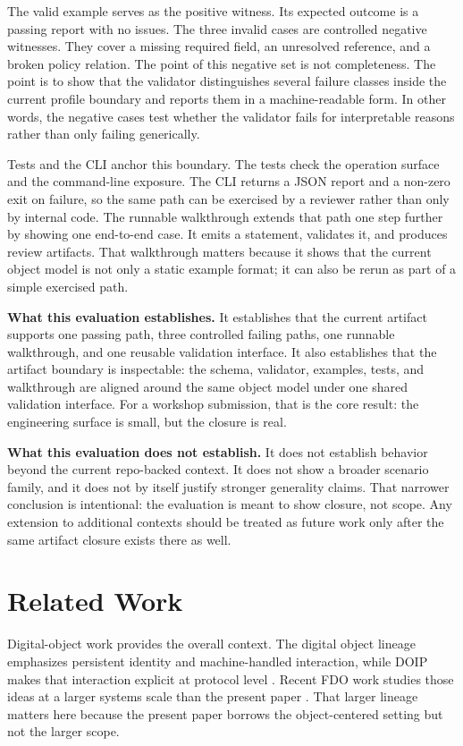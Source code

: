 \documentclass[conference]{IEEEtran}
\begin{document}
The valid example serves as the positive witness. Its expected outcome is a passing report with no issues. The three invalid cases are controlled negative witnesses. They cover a missing required field, an unresolved reference, and a broken policy relation. The point of this negative set is not completeness. The point is to show that the validator distinguishes several failure classes inside the current profile boundary and reports them in a machine-readable form. In other words, the negative cases test whether the validator fails for interpretable reasons rather than only failing generically.

Tests and the CLI anchor this boundary. The tests check the operation surface and the command-line exposure. The CLI returns a JSON report and a non-zero exit on failure, so the same path can be exercised by a reviewer rather than only by internal code. The runnable walkthrough extends that path one step further by showing one end-to-end case. It emits a statement, validates it, and produces review artifacts. That walkthrough matters because it shows that the current object model is not only a static example format; it can also be rerun as part of a simple exercised path.

\textbf{What this evaluation establishes.} It establishes that the current artifact supports one passing path, three controlled failing paths, one runnable walkthrough, and one reusable validation interface. It also establishes that the artifact boundary is inspectable: the schema, validator, examples, tests, and walkthrough are aligned around the same object model under one shared validation interface. For a workshop submission, that is the core result: the engineering surface is small, but the closure is real.

\textbf{What this evaluation does not establish.} It does not establish behavior beyond the current repo-backed context. It does not show a broader scenario family, and it does not by itself justify stronger generality claims. That narrower conclusion is intentional: the evaluation is meant to show closure, not scope. Any extension to additional contexts should be treated as future work only after the same artifact closure exists there as well.

\section{Related Work}

Digital-object work provides the overall context. The digital object lineage emphasizes persistent identity and machine-handled interaction, while DOIP makes that interaction explicit at protocol level \cite{kahn2006framework,dona2018doip}. Recent FDO work studies those ideas at a larger systems scale than the present paper \cite{soilandreyes2024evaluating}. That larger lineage matters here because the present paper borrows the object-centered setting but not the larger scope.
\end{document}
